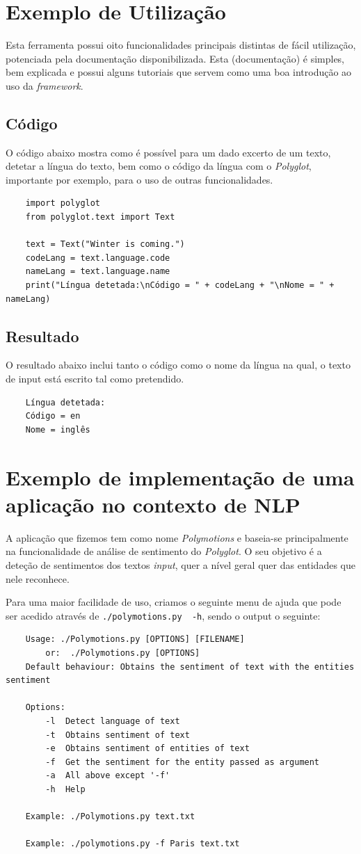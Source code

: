 \documentclass{article}
\begin{document}
\section{Exemplo de Utilização}
\qquad Esta ferramenta possui oito funcionalidades principais distintas de fácil utilização, potenciada pela documentação disponibilizada. Esta (documentação) é simples, bem explicada e possui alguns tutoriais que servem como uma boa introdução ao uso da \textit{framework}.
\subsection{Código}
\qquad O código abaixo mostra como é possível para um dado excerto de um texto, detetar a língua do texto, bem como o código da língua com o \textit{Polyglot}, importante por exemplo, para o uso de outras funcionalidades.

\begin{verbatim}
    import polyglot
    from polyglot.text import Text

    text = Text("Winter is coming.")
    codeLang = text.language.code
    nameLang = text.language.name
    print("Língua detetada:\nCódigo = " + codeLang + "\nNome = " + nameLang)
\end{verbatim}

\subsection{Resultado}
\qquad O resultado abaixo inclui tanto o código como o nome da língua na qual, o texto de input está escrito tal como pretendido.
\begin{verbatim}
    Língua detetada:
    Código = en
    Nome = inglês
\end{verbatim}


\section{Exemplo de implementação de uma aplicação no contexto de NLP}
\qquad
A aplicação que fizemos tem como nome \textit{Polymotions} e baseia-se principalmente na funcionalidade de análise de sentimento do \textit{Polyglot}. O seu objetivo é a deteção de sentimentos dos textos \textit{input}, quer a nível geral quer das entidades que nele reconhece.

Para uma maior facilidade de uso, criamos o seguinte menu de ajuda que pode ser acedido através de \verb|./polymotions.py  -h|, sendo o output o seguinte:
\begin{verbatim}
    Usage: ./Polymotions.py [OPTIONS] [FILENAME]
        or:  ./Polymotions.py [OPTIONS]
    Default behaviour: Obtains the sentiment of text with the entities sentiment

    Options:
        -l	Detect language of text
        -t	Obtains sentiment of text
        -e	Obtains sentiment of entities of text
        -f	Get the sentiment for the entity passed as argument
        -a	All above except '-f'
        -h	Help

    Example: ./Polymotions.py text.txt

    Example: ./polymotions.py -f Paris text.txt

\end{verbatim}
\end{document}

